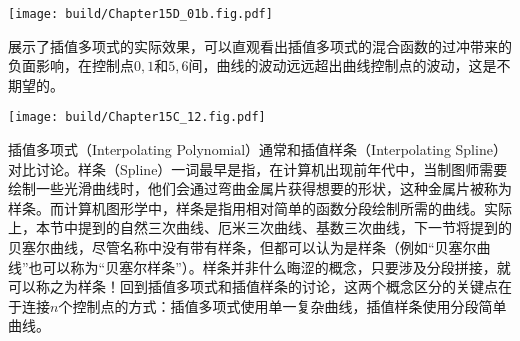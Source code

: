 \begin{Figure}[拉格朗日形式插值多项式的混合函数]
    \texttt{[image: build/Chapter15D\_01b.fig.pdf]}
\end{Figure}

展示了插值多项式的实际效果，可以直观看出插值多项式的混合函数的过冲带来的负面影响，在控制点$0,1$和$5,6$间，曲线的波动远远超出曲线控制点的波动，这是不期望的。

\begin{Figure}[拉格朗日形式插值多项式的效果]
    \texttt{[image: build/Chapter15C\_12.fig.pdf]}
\end{Figure}

插值多项式（Interpolating Polynomial）通常和插值样条（Interpolating Spline）对比讨论。样条（Spline）一词最早是指，在计算机出现前年代中，当制图师需要绘制一些光滑曲线时，他们会通过弯曲金属片获得想要的形状，这种金属片被称为样条。而计算机图形学中，样条是指用相对简单的函数分段绘制所需的曲线。实际上，本节中提到的自然三次曲线、厄米三次曲线、基数三次曲线，下一节将提到的贝塞尔曲线，尽管名称中没有带有样条，但都可以认为是样条（例如“贝塞尔曲线”也可以称为“贝塞尔样条”）。样条并非什么晦涩的概念，只要涉及分段拼接，就可以称之为样条！回到插值多项式和插值样条的讨论，这两个概念区分的关键点在于连接$n$个控制点的方式：插值多项式使用单一复杂曲线，插值样条使用分段简单曲线。

